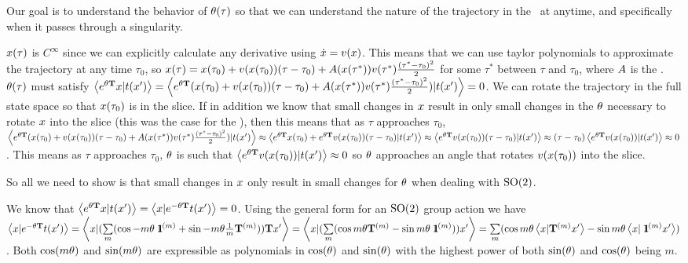 {Our goal is to understand the behavior of ${\bf \theta}(\tau)$  so that we can understand the nature of the trajectory in the \reducedsp\ at anytime, and specifically when it passes through a singularity.

$x(\tau)$ is $C^{\infty}$ since we can explicitly calculate any derivative using $\dot{x}=v(x)$. This means that we can use taylor polynomials to approximate the trajectory at any time $\tau_0$, so $x(\tau)=x(\tau_0)+v(x(\tau_0)) (\tau-\tau_0)+A(x(\tau^*))v(\tau^*) \frac{(\tau^*-\tau_0)^2}{2}$ for some $\tau^*$ between $\tau$ and $\tau_0$, where $A$ is the \stabmat. ${\bf \theta}(\tau)$ must satisfy $\left\langle {e^{\ensuremath{{\bf \theta}}\ensuremath{\mathbf{T}}}\ensuremath{x}}|{t(x')} \right\rangle=\left\langle {e^{\ensuremath{{\bf \theta}}\ensuremath{\mathbf{T}}}(\ensuremath{x}(\tau_0)+\ensuremath{v}(\ensuremath{x}(\tau_0)) (\tau-\tau_0)+\ensuremath{A}(\ensuremath{x}(\tau^*))\ensuremath{v}(\tau^*) \frac{(\tau^*-\tau_0)^2}{2})}|{t(x')} \right\rangle=0$. We can rotate the trajectory in the full state space so that $x(\tau_0)$ is in the slice. If in addition we know that small changes in $x$ result in only small changes in the ${\bf \theta}$ necessary to rotate $x$ into the slice (this was the case for the \cLe), then this means that as $\tau$ approaches $\tau_0$, $\left\langle {e^{\ensuremath{{\bf \theta}}\ensuremath{\mathbf{T}}}(\ensuremath{x}(\tau_0)+\ensuremath{v}(\ensuremath{x}(\tau_0)) (\tau-\tau_0)+\ensuremath{A}(\ensuremath{x}(\tau^*))\ensuremath{v}(\tau^*) \frac{(\tau^*-\tau_0)^2}{2})}|{t(x')} \right\rangle \approx \left\langle {e^{\ensuremath{{\bf \theta}}\ensuremath{\mathbf{T}}}\ensuremath{x}(\tau_0)+ e^{\ensuremath{{\bf \theta}}\ensuremath{\mathbf{T}}}\ensuremath{v}(\ensuremath{x}(\tau_0)) (\tau-\tau_0)}|{t(x')} \right\rangle\approx \left\langle {e^{\ensuremath{{\bf \theta}}\ensuremath{\mathbf{T}}}\ensuremath{v}(\ensuremath{x}(\tau_0)) (\tau-\tau_0)}|{t(x')} \right\rangle\approx (\tau-\tau_0)\left\langle {e^{\ensuremath{{\bf \theta}}\ensuremath{\mathbf{T}}}\ensuremath{v}(\ensuremath{x}(\tau_0))}|{t(x')} \right\rangle\approx 0$. This means as $\tau$ approaches $\tau_0$, ${\bf \theta}$ is such that
$\left\langle {e^{\ensuremath{{\bf \theta}}\ensuremath{\mathbf{T}}}\ensuremath{v}(\ensuremath{x}(\tau_0))}|{t(x')} \right\rangle\approx 0$ so ${\bf \theta}$ approaches an angle that rotates $v(x(\tau_0))$ into the slice.

So all we need to show is that small changes in $x$ only result in small changes for ${\bf \theta}$ when dealing with $\textrm{SO}(2)$.

We know that $\left\langle {e^{\ensuremath{{\bf \theta}}\ensuremath{\mathbf{T}}}\ensuremath{x}}|{t(x')} \right\rangle=\left\langle {\ensuremath{x}}|{e^{-{\bf \theta} \mathbf{T}}t(x')} \right\rangle=0$.
Using the general form for an $\textrm{SO}(2)$ group action we have $\left\langle {\ensuremath{x}}|{e^{-{\bf \theta} \mathbf{T}}t(x')} \right\rangle=\left\langle {\ensuremath{x}}|{(\sum\limits_m (\cos{-m\ensuremath{{\bf \theta}}} {\ \hbox{{\rm 1}\kern-.6em\hbox{\rm 1}}}^{(m)}+\sin{-m\ensuremath{{\bf \theta}}} \frac{1}{m}\mathbf{T}^{(m)})) \mathbf{T} x'} \right\rangle=\left\langle {\ensuremath{x}}|{(\sum\limits_m (\cos{m\ensuremath{{\bf \theta}}} \mathbf{T}^{(m)}-\sin{m\ensuremath{{\bf \theta}}} {\ \hbox{{\rm 1}\kern-.6em\hbox{\rm 1}}}^{(m)})) x'} \right\rangle=\sum\limits_m(\cos{m\ensuremath{{\bf \theta}}} \left\langle {\ensuremath{x}}|{\mathbf{T}^{(m)} x'} \right\rangle-\sin{m\ensuremath{{\bf \theta}}} \left\langle {\ensuremath{x}}|{{\ \hbox{{\rm 1}\kern-.6em\hbox{\rm 1}}}^{(m)} x'} \right\rangle)$. Both $\cos(m{\bf \theta})$ and $\sin(m{\bf \theta})$ are expressible as polynomials in $\cos({\bf \theta})$ and $\sin({\bf \theta})$ with the highest power of both $\sin({\bf \theta})$ and $\cos({\bf \theta})$ being $m$.


}

